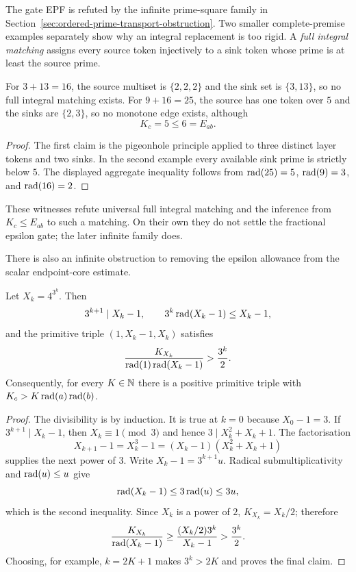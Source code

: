 The gate EPF is refuted by the infinite prime-square family in
Section~\ref{sec:ordered-prime-transport-obstruction}.  Two smaller
complete-premise examples separately show why an integral replacement is too
rigid.  A \emph{full integral
matching} assigns every source token injectively to a sink token whose prime
is at least the source prime.

\begin{proposition}
For $3+13=16$, the source multiset is $\{2,2,2\}$ and the sink set is
$\{3,13\}$, so no full integral matching exists.  For $9+16=25$, the source
has one token over $5$ and the sinks are $\{2,3\}$, so no monotone edge
exists, although
\[
 K_c=5\le6=E_{ab}.
\]
\end{proposition}

\begin{proof}
The first claim is the pigeonhole principle applied to three distinct layer
tokens and two sinks.  In the second example every available sink prime is
strictly below $5$.  The displayed aggregate inequality follows from
$\operatorname{rad}(25)=5$, $\operatorname{rad}(9)=3$, and $\operatorname{rad}(16)=2$.
\end{proof}

These witnesses refute universal full integral matching and the inference
from $K_c\le E_{ab}$ to such a matching.  On their own they do not settle the
fractional epsilon gate; the later infinite family does.

There is also an infinite obstruction to removing the epsilon allowance from
the scalar endpoint-core estimate.

\begin{proposition}
Let $X_k=4^{3^k}$.  Then
\[
 3^{k+1}\mid X_k-1,\qquad
 3^k\operatorname{rad}(X_k-1)\le X_k-1,
\]
and the primitive triple $(1,X_k-1,X_k)$ satisfies
\[
 \frac{K_{X_k}}{\operatorname{rad}(1)\operatorname{rad}(X_k-1)}>\frac{3^k}{2}.
\]
Consequently, for every $K\in\mathbb N$ there is a positive primitive triple with
$K_c>K\operatorname{rad}(a)\operatorname{rad}(b)$.
\end{proposition}

\begin{proof}
The divisibility is by induction.  It is true at $k=0$ because $X_0-1=3$.
If $3^{k+1}\mid X_k-1$, then $X_k\equiv1\pmod3$ and hence
$3\mid X_k^2+X_k+1$.  The factorisation
\[
 X_{k+1}-1=X_k^3-1=(X_k-1)(X_k^2+X_k+1)
\]
supplies the next power of $3$.  Write $X_k-1=3^{k+1}u$.  Radical
submultiplicativity and $\operatorname{rad}(u)\le u$ give
\[
 \operatorname{rad}(X_k-1)\le3\operatorname{rad}(u)\le3u,
\]
which is the second inequality.  Since $X_k$ is a power of $2$,
$K_{X_k}=X_k/2$; therefore
\[
 \frac{K_{X_k}}{\operatorname{rad}(X_k-1)}
 \ge \frac{(X_k/2)3^k}{X_k-1}>\frac{3^k}{2}.
\]
Choosing, for example, $k=2K+1$ makes $3^k>2K$ and proves the final claim.
\end{proof}

